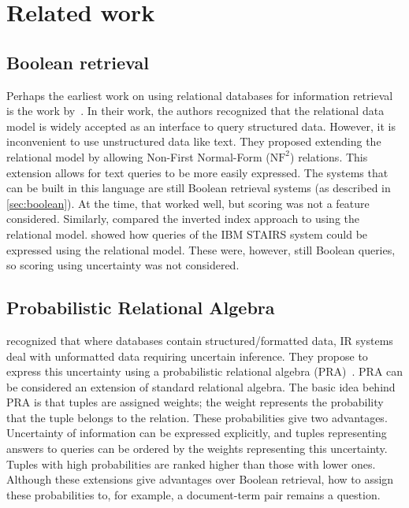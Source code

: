 \section{Related work}

\subsection{Boolean retrieval}
Perhaps the earliest work on using relational databases for information retrieval is the work by~\citet{SchekPistor}. In their work, the authors recognized that the relational data model is widely accepted as an interface to query structured data. However, it is inconvenient to use unstructured data like text. They proposed extending the relational model by allowing Non-First Normal-Form ($\text{NF}^2$) relations. This extension allows for text queries to be more easily expressed. The systems that can be built in this language are still Boolean retrieval systems (as described in \cref{sec:boolean}). At the time, that worked well, but scoring was not a feature considered.  
Similarly, \citet{macleod} compared the inverted index approach to using the relational model.  showed how queries of the IBM STAIRS system could be expressed using the relational model. These were, however, still Boolean queries, so scoring using uncertainty was not considered. 

\subsection{Probabilistic Relational Algebra}
 recognized that where databases contain structured/formatted data, IR systems deal with unformatted data requiring uncertain inference. They propose to express this uncertainty using a probabilistic relational algebra (PRA)~\citep{fuhr-pra}. 
PRA can be considered an extension of standard relational algebra. 
The basic idea behind PRA is that tuples are assigned weights; the weight represents the probability that the tuple belongs to the relation. These probabilities give two advantages. Uncertainty of information can be expressed explicitly, and tuples representing answers to queries can be ordered by the weights representing this uncertainty. Tuples with high probabilities are ranked higher than those with lower ones. Although these extensions give advantages over Boolean retrieval, how to assign these probabilities to, for example, a document-term pair remains a question.

